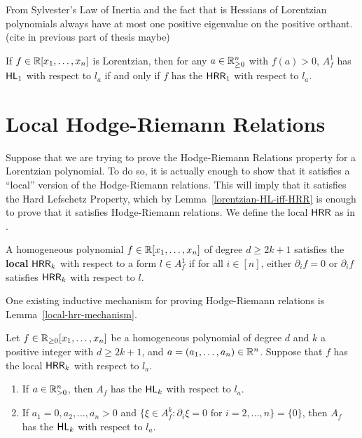 \documentclass{puthesis-UG}
\begin{document}
From Sylvester's Law of Inertia and the fact that is Hessians of Lorentzian polynomials always have at most one positive eigenvalue on the positive orthant. (cite in previous part of thesis maybe)
\begin{lem} \label{lorentzian-HL-iff-HRR}
	If $f \in \mathbb{R} [x_1, \ldots, x_n]$ is Lorentzian, then for any $a \in \mathbb{R}_{\geq 0}^n$ with $f(a) > 0$, $A_f^1$ has $\mathsf{HL}_1$ with respect to $l_a$ if and only if $f$ has the $\mathsf{HRR}_1$ with respect to $l_a$. 
\end{lem}
\section{Local Hodge-Riemann Relations}

Suppose that we are trying to prove the Hodge-Riemann Relations property for a Lorentzian polynomial. To do so, it is actually enough to show that it satisfies a ``local'' version of the Hodge-Riemann relations. This will imply that it satisfies the Hard Lefschetz Property, which by Lemma~\ref{lorentzian-HL-iff-HRR} is enough to prove that it satisfies Hodge-Riemann relations. We define the local $\mathsf{HRR}$ as in \cite{MNY}. 

\begin{defn}
	A homogeneous polynomial $f \in \mathbb{R}[x_1, \ldots, x_n]$ of degree $d \geq 2k+1$ satisfies the \textbf{local} $\mathsf{HRR}_k$ with respect to a form $l \in A_f^1$ if for all $i \in [n]$, either $\partial_i f = 0$ or $\partial_i f$ satisfies $\mathsf{HRR}_k$ with respect to $l$. 
\end{defn}

One existing inductive mechanism for proving Hodge-Riemann relations is Lemma~\ref{local-hrr-mechanism}. 

\begin{lem}  \label{local-hrr-mechanism}
	Let $f \in \mathbb{R}_{\geq 0}[x_1, \ldots, x_n]$ be a homogeneous polynomial of degree $d$ and $k$ a positive integer with $d \geq 2k+1$, and $a = (a_1, \ldots, a_n) \in \mathbb{R}^n$. Suppose that $f$ has the local $\mathsf{HRR}_k$ with respect to $l_a$. 
	\begin{enumerate}[label = (\roman*)]
		\item If $a \in \mathbb{R}_{> 0}^n$, then $A_f$ has the $\mathsf{HL}_k$ with respect to $l_a$. 
		\item If $a_1 = 0, a_2, \ldots, a_n > 0$ and $\{\xi \in A_f^k : \partial_i \xi = 0 \text{ for $i = 2, \ldots, n$}\} = \{0\}$, then $A_f$ has the $\mathsf{HL}_k$ with respect to $l_a$. 
	\end{enumerate}
\end{lem}
\end{document}
